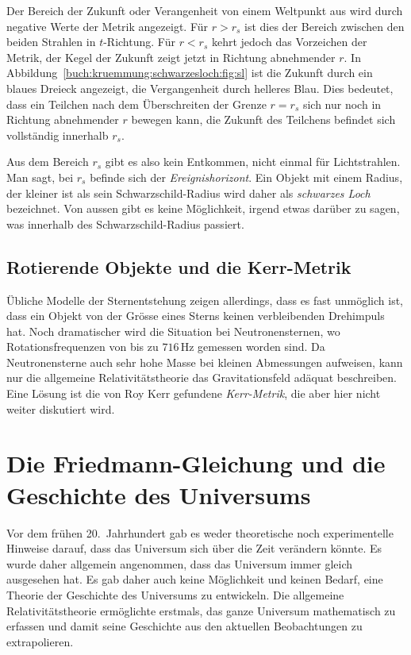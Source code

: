 Der Bereich der Zukunft oder Verangenheit von einem Weltpunkt aus
wird durch negative Werte der Metrik angezeigt.
Für $r>r_s$ ist dies der Bereich zwischen den beiden Strahlen in
$t$-Richtung.
Für $r<r_s$ kehrt jedoch das Vorzeichen der Metrik, der Kegel der
Zukunft zeigt jetzt in Richtung abnehmender $r$.
In Abbildung~\ref{buch:kruemmung:schwarzesloch:fig:sl} ist die
Zukunft durch ein blaues Dreieck angezeigt, die Vergangenheit durch
helleres Blau.
Dies bedeutet, dass ein Teilchen nach dem Überschreiten der Grenze $r=r_s$
sich nur noch in Richtung abnehmender $r$ bewegen kann, die Zukunft des
Teilchens befindet sich vollständig innerhalb $r_s$.

Aus dem Bereich $r_s$ gibt es also kein Entkommen, nicht einmal
für Lichtstrahlen.
Man sagt, bei $r_s$ befinde sich der \emph{Ereignishorizont}.
%
Ein Objekt mit einem Radius, der kleiner ist als sein Schwarzschild-Radius
wird daher als \emph{schwarzes Loch} bezeichnet.
%
Von aussen gibt es keine Möglichkeit, irgend etwas darüber zu sagen,
was innerhalb des Schwarzschild-Radius passiert.


\subsection{Rotierende Objekte und die Kerr-Metrik}
Übliche Modelle der Sternentstehung zeigen allerdings, dass es fast
unmöglich ist, dass ein Objekt von der Grösse eines Sterns keinen 
verbleibenden Drehimpuls hat.
Noch dramatischer wird die Situation bei Neutronensternen, wo 
Rotationsfrequenzen von bis zu $716\,\text{Hz}$ gemessen worden sind.
Da Neutronensterne auch sehr hohe Masse bei kleinen Abmessungen
aufweisen, kann nur die allgemeine Relativitätstheorie das Gravitationsfeld
adäquat beschreiben.
Eine Lösung ist die von Roy Kerr gefundene \emph{Kerr-Metrik},
die aber hier nicht weiter diskutiert wird.
%
%


%
%
\section{Die Friedmann-Gleichung und die Geschichte des Universums
\label{buch:kruemmung:section:friedmann}}
Vor dem frühen 20.~Jahrhundert gab es weder theoretische noch experimentelle
Hinweise darauf, dass das Universum sich über die Zeit verändern könnte.
Es wurde daher allgemein angenommen, dass das Universum immer gleich
ausgesehen hat.
Es gab daher auch keine Möglichkeit und keinen Bedarf, eine Theorie der
Geschichte des Universums zu entwickeln.
Die allgemeine Relativitätstheorie ermöglichte erstmals, das ganze
Universum mathematisch zu erfassen und damit seine Geschichte aus
den aktuellen Beobachtungen zu extrapolieren.

